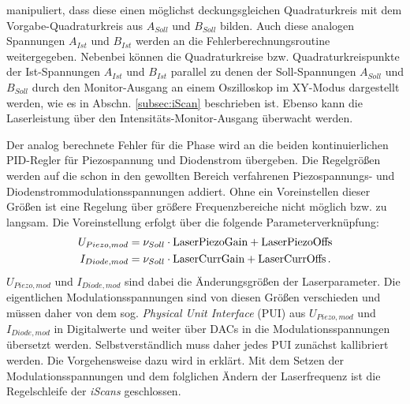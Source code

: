 manipuliert, dass diese einen möglichst deckungsgleichen Quadraturkreis mit dem
Vorgabe-Quadraturkreis aus $A_{Soll}$ und $B_{Soll}$ bilden. Auch diese analogen
Spannungen $A_{Ist}$ und $B_{Ist}$ werden an die Fehlerberechnungsroutine
weitergegeben. Nebenbei können die Quadraturkreise bzw. Quadraturkreispunkte der
Ist-Spannungen $A_{Ist}$ und $B_{Ist}$ parallel zu denen der Soll-Spannungen
$A_{Soll}$ und $B_{Soll}$ durch den Monitor-Ausgang an einem Oszilloskop im
XY-Modus dargestellt werden, wie es in Abschn. \ref{subsec:iScan} beschrieben
ist. Ebenso kann die Laserleistung über den Intensitäts-Monitor-Ausgang
überwacht werden.\par Der analog berechnete Fehler für die Phase wird an die beiden
kontinuierlichen PID-Regler für Piezospannung und Diodenstrom übergeben. Die
Regelgrößen werden auf die schon in den gewollten Bereich verfahrenen
Piezospannungs- und Diodenstrommodulationsspannungen addiert. Ohne ein
Voreinstellen dieser Größen ist eine Regelung über größere Frequenzbereiche
nicht möglich bzw. zu langsam. Die Voreinstellung erfolgt über die folgende
Parameterverknüpfung:
\begin{equation}\label{eq:iscan_PUs}
	\begin{split}
		U_{Piezo,mod}&=\nu_{Soll}\cdot\text{\lstinline|LaserPiezoGain|}+\text{\lstinline|LaserPiezoOffs|}\\
		I_{Diode,mod}&=\nu_{Soll}\cdot\text{\lstinline|LaserCurrGain|}+\text{\lstinline|LaserCurrOffs|}\,.
	\end{split}
\end{equation}
$U_{Piezo,mod}$ und $I_{Diode,mod}$ sind dabei die Änderungsgrößen der
Laserparameter. Die eigentlichen Modulationsspannungen
sind von diesen Größen verschieden und müssen daher von dem sog.
\textit{Physical Unit Interface} (PUI) aus $U_{Piezo,mod}$ und $I_{Diode,mod}$ in Digitalwerte und weiter über DACs in die Modulationsspannungen übersetzt werden.
Selbstverständlich muss daher jedes PUI zunächst kallibriert werden. Die
Vorgehensweise dazu wird in \cite{iscan_hardware_guide}
erklärt. Mit dem Setzen der Modulationsspannungen und dem folglichen Ändern der
Laserfrequenz ist die Regelschleife der \textit{iScans} geschlossen.

